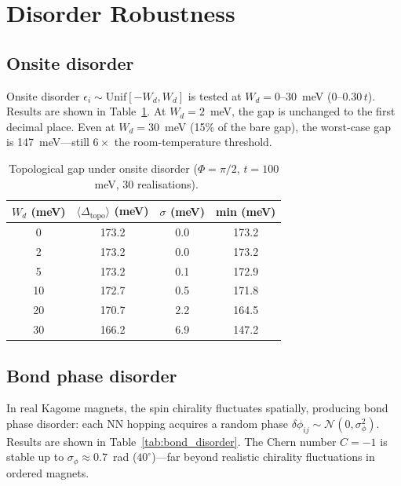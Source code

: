 \documentclass[aps,prb,twocolumn,superscriptaddress,floatfix]{revtex4-2}
\begin{document}
\section{Disorder Robustness}
\label{sec:disorder}

\subsection{Onsite disorder}

Onsite disorder $\epsilon_i \sim \mathrm{Unif}[-W_d, W_d]$ is tested at $W_d = 0$--$30$~meV ($0$--$0.30\,t$). Results are shown in Table~\ref{tab:disorder}. At $W_d = 2$~meV, the gap is unchanged to the first decimal place. Even at $W_d = 30$~meV (15\% of the bare gap), the worst-case gap is 147~meV---still $6\times$ the room-temperature threshold.

\begin{table}[b]
\caption{Topological gap under onsite disorder ($\Phi = \pi/2$, $t = 100$~meV, 30 realisations).}
\label{tab:disorder}
\begin{ruledtabular}
\begin{tabular}{cccc}
$W_d$ (meV) & $\langle\Delta_{\mathrm{topo}}\rangle$ (meV) & $\sigma$ (meV) & min (meV) \\
\hline
0 & 173.2 & 0.0 & 173.2 \\
2 & 173.2 & 0.0 & 173.2 \\
5 & 173.2 & 0.1 & 172.9 \\
10 & 172.7 & 0.5 & 171.8 \\
20 & 170.7 & 2.2 & 164.5 \\
30 & 166.2 & 6.9 & 147.2 \\
\end{tabular}
\end{ruledtabular}
\end{table}

\subsection{Bond phase disorder}
\label{sec:bond_disorder}

In real Kagome magnets, the spin chirality fluctuates spatially, producing bond phase disorder: each NN hopping acquires a random phase $\delta\phi_{ij} \sim \mathcal{N}(0, \sigma_\phi^2)$. Results are shown in Table~\ref{tab:bond_disorder}. The Chern number $C = -1$ is stable up to $\sigma_\phi \approx 0.7$~rad ($40^\circ$)---far beyond realistic chirality fluctuations in ordered magnets.
\end{document}
